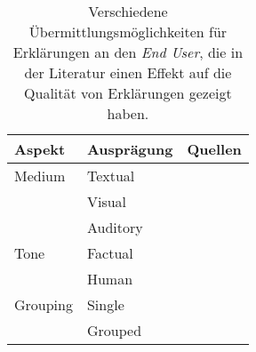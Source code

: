 \begin{table}
    \begin{center}
        \begin{tabular}{|p{}|p{}|p{}|}
            \hline
            \textbf{Aspekt}     & \textbf{Ausprägung} & \textbf{Quellen} \\ \hline
            Medium              & Textual  &    \cite{sokol_explainability_2020} \cite{balog_measuring_2020}
                                                \cite{tintarev_designing_nodate} \cite{sato_action-triggering_2019}
                                                \cite{eiband_impact_2019} \cite{eiband_impact_2019}
                                                \cite{abdulrahman_belief-based_2019} \cite{cassens_ambient_2019}
                                                \cite{nunes_systematic_2017} \\
                                & Visual    &   \cite{sokol_explainability_2020} \cite{sato_action-triggering_2019} 
                                                \cite{mucha_interfaces_2021} \cite{abdulrahman_belief-based_2019}
                                                \cite{nunes_systematic_2017} \cite{schrills_color_2020} \\
                                & Auditory     &   \cite{wiegand2019drive} \cite{nunes_systematic_2017}
                                                \cite{wang_is_2018} \\
            \hline
            Tone                & Factual   &   \cite{eiband_impact_2019} \cite{abdulrahman_belief-based_2019}
                                                \cite{kunkel_let_2019} \cite{neerincx_using_2018} \\
                                & Human     &   \cite{abdulrahman_belief-based_2019} \cite{kunkel_let_2019}
                                                \cite{weitz_you_2019} \cite{zahedi_towards_2019}
                                                \cite{neerincx_using_2018} \\
            \hline
            Grouping            & Single    &   \cite{nunes_systematic_2017} \cite{balog_measuring_2020}
                                                \cite{sato_action-triggering_2019} \cite{eiband_impact_2019}
                                                \cite{abdulrahman_belief-based_2019} \\
                                & Grouped   &   \cite{nunes_systematic_2017} \cite{balog_measuring_2020}
                                                \cite{tintarev_designing_nodate}  \\
            \hline
        \end{tabular}
    \end{center}
    \caption{Verschiedene Übermittlungsmöglichkeiten für Erklärungen an den \textit{End User}, die in der Literatur einen Effekt auf die Qualität von Erklärungen gezeigt haben.}
    \label{tab:presentation_of_explanations}
\end{table}

